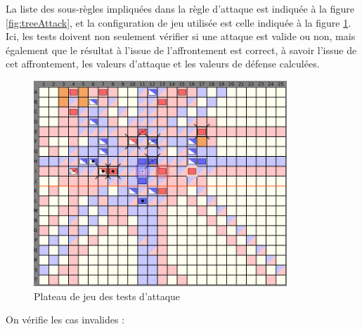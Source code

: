 \documentclass[a4paper]{report}
\begin{document}
La liste des sous-règles impliquées dans la règle d'attaque est indiquée à la figure \ref{fig:treeAttack}, et la configuration de jeu utilisée est celle indiquée à la figure \ref{fig:boardAttack}. Ici, les tests doivent non seulement vérifier si une attaque est valide ou non, mais également que le résultat à l'issue de l'affrontement est correct, à savoir l'issue de cet affrontement, les valeurs d'attaque et les valeurs de défense calculées.

\begin{figure}[h]
\centering
\includegraphics[width=0.85\textwidth]{tests/plateauAttaque}
\caption{Plateau de jeu des tests d'attaque}\label{fig:boardAttack}
\end{figure}

On vérifie les cas invalides :
\end{document}

